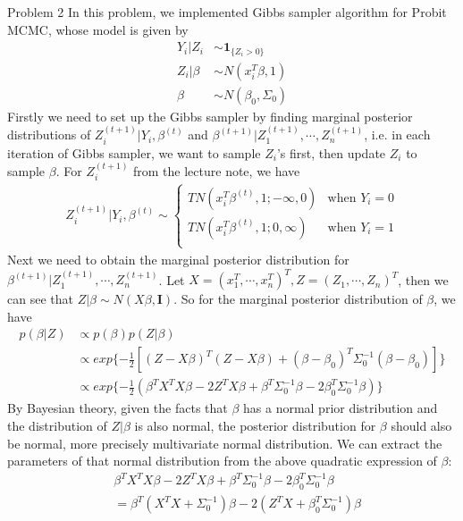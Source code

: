 \documentclass[12pt]{article}
\begin{document}
Problem 2 \newline \newline
In this problem, we implemented Gibbs sampler algorithm for Probit MCMC, whose model is given by
\begin{align*}
	Y_i|Z_i &\sim \mathbf{1}_{\{Z_i > 0\}} \\
	Z_i | \beta &\sim N(x^T_i\beta, 1) \\
	\beta &\sim N(\beta_0, \Sigma_0)
\end{align*}
Firstly we need to set up the Gibbs sampler by finding marginal posterior distributions of $Z_i^{(t+1)}|Y_i, \beta^{(t)}$ and $\beta^{(t+1)}|Z_1^{(t+1)},\cdots, Z_n^{(t+1)}$, i.e. in each iteration of Gibbs sampler, we want to sample $Z_i$'s first, then update $Z_i$ to sample $\beta$. For $Z_i^{(t+1)}$ from the lecture note, we have
\begin{align*}
	Z_i^{(t+1)}|Y_i, \beta^{(t)} \sim \begin{cases}
		TN(x_i^T\beta^{(t)}, 1; -\infty, 0) &\mbox{when } Y_i = 0 \\
		TN(x_i^T\beta^{(t)}, 1; 0, \infty) &\mbox{when } Y_i = 1 \\
	\end{cases}
\end{align*}
Next we need to obtain the marginal posterior distribution for $\beta^{(t+1)}|Z_1^{(t+1)},\cdots, Z_n^{(t+1)}$. Let $X = (x_1^T,\cdots,x_n^T)^T, Z = (Z_1, \cdots, Z_n)^T$, then we can see that $Z|\beta \sim N(X\beta, \mathbf{I})$. So for the marginal posterior distribution of $\beta$, we have
\begin{align*}
	p(\beta|Z) &\propto p(\beta)p(Z|\beta) \\
	&\propto exp\{-\frac{1}{2}[(Z - X\beta)^T(Z-X\beta) + (\beta - \beta_0)^T\Sigma_0^{-1}(\beta - \beta_0)]\} \\
	&\propto exp\{-\frac{1}{2}(\beta^TX^TX\beta - 2Z^TX\beta + \beta^T\Sigma_0^{-1}\beta -2\beta_0^T\Sigma_0^{-1}\beta)\}
\end{align*}
By Bayesian theory, given the facts that $\beta$ has a normal prior distribution and the distribution of $Z|\beta$ is also normal, the posterior distribution for $\beta$ should also be normal, more precisely multivariate normal distribution. We can extract the parameters of that normal distribution from the above quadratic expression  of $\beta$:
\begin{align*}
	&\beta^TX^TX\beta - 2Z^TX\beta + \beta^T\Sigma_0^{-1}\beta -2\beta_0^T\Sigma_0^{-1}\beta \\
	&= \beta^T(X^TX + \Sigma_0^{-1})\beta -2(Z^TX+\beta_0^T\Sigma_0^{-1})\beta
\end{align*}
\end{document}

